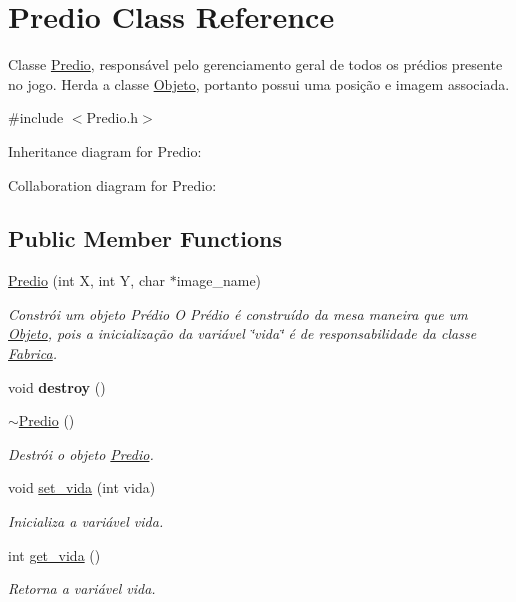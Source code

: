 \hypertarget{classPredio}{}\section{Predio Class Reference}
\label{classPredio}


Classe \hyperlink{classPredio}{Predio}, responsável pelo gerenciamento geral de todos os prédios presente no jogo. Herda a classe \hyperlink{classObjeto}{Objeto}, portanto possui uma posição e imagem associada.  




{\ttfamily \#include $<$Predio.\+h$>$}



Inheritance diagram for Predio\+:


Collaboration diagram for Predio\+:
\subsection*{Public Member Functions}
\begin{DoxyCompactItemize}
\item 
\hyperlink{classPredio_ade4ff616f1a63a65738be1b2c85c0cb3}{Predio} (int X, int Y, char $\ast$image\+\_\+name)
\begin{DoxyCompactList}\small\item\em Constrói um objeto Prédio O Prédio é construído da mesa maneira que um \hyperlink{classObjeto}{Objeto}, pois a inicialização da variável \char`\"{}vida\char`\"{} é de responsabilidade da classe \hyperlink{classFabrica}{Fabrica}. \end{DoxyCompactList}\item 
void {\bfseries destroy} ()\hypertarget{classPredio_aef23b892d39d15b9aab03d77628cffa0}{}\label{classPredio_aef23b892d39d15b9aab03d77628cffa0}

\item 
\hyperlink{classPredio_af727252390373e3dc0e40641fd79dc37}{$\sim$\+Predio} ()\hypertarget{classPredio_af727252390373e3dc0e40641fd79dc37}{}\label{classPredio_af727252390373e3dc0e40641fd79dc37}

\begin{DoxyCompactList}\small\item\em Destrói o objeto \hyperlink{classPredio}{Predio}. \end{DoxyCompactList}\item 
void \hyperlink{classPredio_a5d8161d6dc412b3f22b00181c89aff1a}{set\+\_\+vida} (int vida)
\begin{DoxyCompactList}\small\item\em Inicializa a variável vida. \end{DoxyCompactList}\item 
int \hyperlink{classPredio_a8bdabeda71179578f79ce6c5270156d6}{get\+\_\+vida} ()
\begin{DoxyCompactList}\small\item\em Retorna a variável vida. \end{DoxyCompactList}\end{DoxyCompactItemize}
